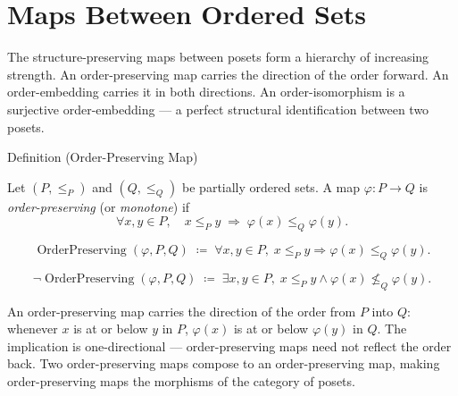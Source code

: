 
\section{Maps Between Ordered Sets}
\label{sec:maps-ordered-sets}

\begin{remark*}
The structure-preserving maps between posets form a hierarchy of increasing
strength.  An order-preserving map carries the direction of the order
forward.  An order-embedding carries it in both directions.  An
order-isomorphism is a surjective order-embedding --- a perfect structural
identification between two posets.
\end{remark*}


\begin{definitionbox}{Definition (Order-Preserving Map)}
\begin{definition}
\label{def:order-preserving-map}
Let $(P, \leq_P)$ and $(Q, \leq_Q)$ be partially ordered sets.  A map
$\varphi : P \to Q$ is \emph{order-preserving} (or \emph{monotone}) if
\[
\forall x, y \in P, \quad
x \leq_P y \;\Longrightarrow\; \varphi(x) \leq_Q \varphi(y).
\]
\end{definition}
\end{definitionbox}

\begin{remark*}
\[
\operatorname{OrderPreserving}(\varphi, P, Q)
\;\coloneqq\;
\forall x, y \in P,\;
x \leq_P y \Rightarrow \varphi(x) \leq_Q \varphi(y).
\]
\end{remark*}

\begin{remark*}
\[
\neg\operatorname{OrderPreserving}(\varphi, P, Q)
\;\coloneqq\;
\exists x, y \in P,\;
x \leq_P y \land \varphi(x) \not\leq_Q \varphi(y).
\]
\end{remark*}

\begin{remark*}[Interpretation]
An order-preserving map carries the direction of the order from $P$ into
$Q$: whenever $x$ is at or below $y$ in $P$, $\varphi(x)$ is at or below
$\varphi(y)$ in $Q$.  The implication is one-directional --- order-preserving
maps need not reflect the order back.  Two order-preserving maps compose
to an order-preserving map, making order-preserving maps the morphisms
of the category of posets.
\end{remark*}

